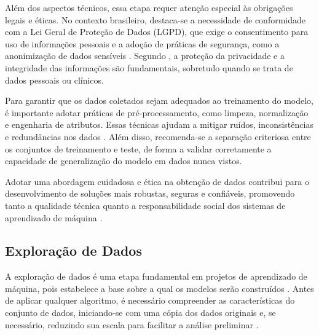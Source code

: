 Além dos aspectos técnicos, essa etapa requer atenção especial às obrigações legais e éticas. No contexto brasileiro, destaca-se a necessidade de conformidade com a Lei Geral de Proteção de Dados (LGPD), que exige o consentimento para uso de informações pessoais e a adoção de práticas de segurança, como a anonimização de dados sensíveis \cite{muller2017}. Segundo , a proteção da privacidade e a integridade das informações são fundamentais, sobretudo quando se trata de dados pessoais ou clínicos.

Para garantir que os dados coletados sejam adequados ao treinamento do modelo, é importante adotar práticas de pré-processamento, como limpeza, normalização e engenharia de atributos. Essas técnicas ajudam a mitigar ruídos, inconsistências e redundâncias nos dados \cite{geron2017}. Além disso, recomenda-se a separação criteriosa entre os conjuntos de treinamento e teste, de forma a validar corretamente a capacidade de generalização do modelo em dados nunca vistos.

Adotar uma abordagem cuidadosa e ética na obtenção de dados contribui para o desenvolvimento de soluções mais robustas, seguras e confiáveis, promovendo tanto a qualidade técnica quanto a responsabilidade social dos sistemas de aprendizado de máquina \cite{geron2017}.

\subsection{Exploração de Dados}
A exploração de dados é uma etapa fundamental em projetos de aprendizado de máquina, pois estabelece a base sobre a qual os modelos serão construídos \cite{geron2017}. Antes de aplicar qualquer algoritmo, é necessário compreender as características do conjunto de dados, iniciando-se com uma cópia dos dados originais e, se necessário, reduzindo sua escala para facilitar a análise preliminar \cite{geron2017}.

